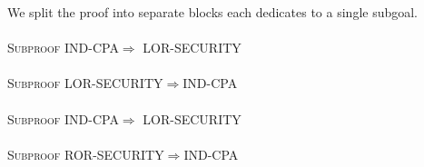 \documentclass{crypto-exercise}
\begin{document}
\begin{solution}
We split the proof into separate blocks each dedicates to a single subgoal.\\\\
\textsc{Subproof} IND-CPA$\Rightarrow$ LOR-SECURITY
\\\\
\textsc{Subproof} LOR-SECURITY$\Rightarrow$IND-CPA
\\\\
\textsc{Subproof} IND-CPA$\Rightarrow$ LOR-SECURITY
\\\\
 \textsc{Subproof} ROR-SECURITY$\Rightarrow$IND-CPA

\end{solution}
\end{document}
